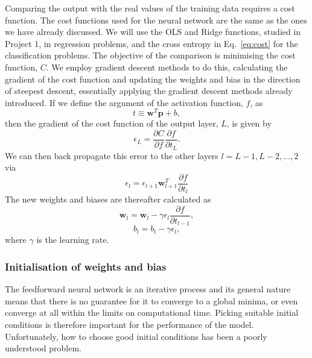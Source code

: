 \documentclass[a4paper, 
amsfonts, 
amssymb, 
amsmath, 
reprint, 
showkeys, 
nofootinbib, 
twoside]{revtex4-2}
\begin{document}
Comparing the output with the real values of the training data requires a cost function. The cost functions used for the neural network are the same as the ones we have already discussed. We will use the OLS and Ridge functions, studied in Project 1, in regression problems, and the cross entropy in Eq.~\eqref{eq:cost} for the classification problems. 
The objective of the comparison is minimising the cost function, $C$. We employ gradient descent methods to do this, calculating the gradient of the cost function and updating the weights and bias in the direction of steepest descent, essentially applying the gradient descent methods already introduced. If we define the argument of the activation function, $f$, as
\begin{equation}
    t \equiv \mathbf{w}^T \mathbf{p} + b,
\end{equation}
then the gradient of the cost function of the output layer, $L$, is given by
\begin{equation}
    \epsilon_L = \frac{\partial C}{\partial f} \frac{\partial f}{\partial t_L}. 
\end{equation}
We can then back propagate this error to the other layers $l = L- 1, L-2, ... , 2$ via
\begin{equation}
    \epsilon_l = \epsilon_{l+1} \mathbf{w}^T_{l+1} \frac{\partial f}{\partial t_l}
\end{equation}
The new weights and biases are thereafter calculated as \begin{equation}
    \mathbf{w}_l = \mathbf{w}_l - \gamma \epsilon_l \frac{\partial f}{\partial t_{l-1}},
\end{equation}
\begin{equation}
    b_l = b_l - \gamma \epsilon_l,
\end{equation}
where $\gamma$ is the learning rate.

\subsubsection{Initialisation of weights and bias}

The feedforward neural network is an iterative process and its general nature means that there is no guarantee for it to converge to a global minima, or even converge at all within the limits on computational time. Picking suitable initial conditions is therefore important for the performance of the model. Unfortunately, how to choose good initial conditions has been a poorly understood problem\cite{gbc16}. 
\end{document}
